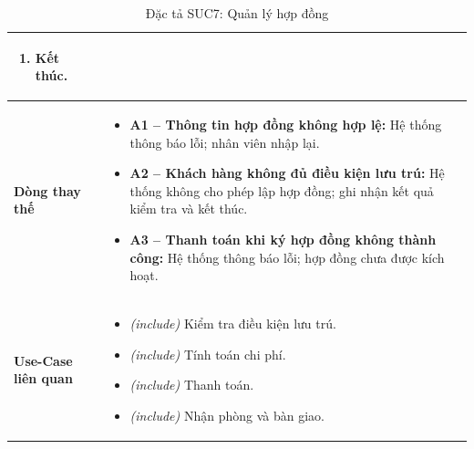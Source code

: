 \begin{table}[H]
\begin{tabularx}{\textwidth}{|>{\centering\arraybackslash\bfseries}m{3.5cm}|X|}
\begin{enumerate}[leftmargin=*, nosep]
        \item Kết thúc.
    \end{enumerate} \\
    \hline
    Dòng thay thế &
    \begin{itemize}[leftmargin=*, nosep, label=-]
        \vspace{0.1cm}
        \item \textbf{A1 -- Thông tin hợp đồng không hợp lệ:} Hệ thống thông báo lỗi; nhân viên nhập lại.
        \item \textbf{A2 -- Khách hàng không đủ điều kiện lưu trú:} Hệ thống không cho phép lập hợp đồng; ghi nhận kết quả kiểm tra và kết thúc.
        \item \textbf{A3 -- Thanh toán khi ký hợp đồng không thành công:} Hệ thống thông báo lỗi; hợp đồng chưa được kích hoạt.
    \end{itemize} \\
    \hline
    Use-Case liên quan &
    \begin{itemize}[leftmargin=*, nosep, label=-]
        \vspace{0.1cm}
        \item \textit{(include)} Kiểm tra điều kiện lưu trú.
        \item \textit{(include)} Tính toán chi phí.
        \item \textit{(include)} Thanh toán.
        \item \textit{(include)} Nhận phòng và bàn giao.
\end{itemize} \\
    \hline
\end{tabularx}
\caption{Đặc tả SUC7: Quản lý hợp đồng}
\end{table}



\vspace{1cm}

